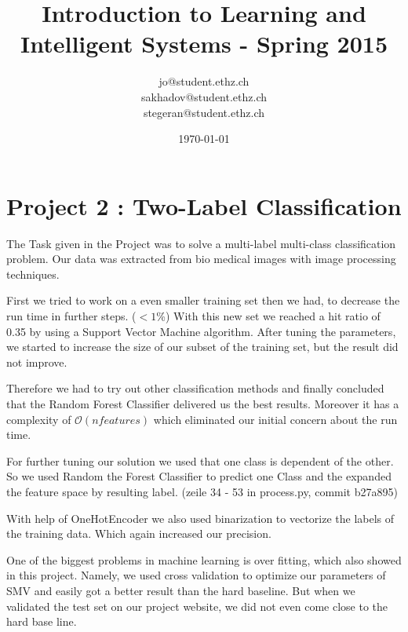 \documentclass[a4paper, 11pt]{article}
\title{Introduction to Learning and Intelligent Systems - Spring 2015}
\author{jo@student.ethz.ch\\ sakhadov@student.ethz.ch\\  stegeran@student.ethz.ch\\}
\date{\today}
\begin{document}
\maketitle

\section*{Project 2 : Two-Label Classification}

The Task given in the Project was to solve a multi-label multi-class classification problem. Our data was extracted from bio medical images with image processing techniques.

First we tried to work on a even smaller training set then we had, to decrease the run time in further steps. ($<1$\%) With this new set we reached a hit ratio of 0.35 by using a Support Vector Machine algorithm. After tuning the parameters, we started to increase the size of our subset of the training set, but the result did not improve.

Therefore we had to try out other classification methods and finally concluded that the Random Forest Classifier delivered us the best results. Moreover it has a complexity of $\mathcal{O}(nfeatures)$ which eliminated our initial concern about the run time.

For further tuning our solution we used that one class is dependent of the other. So we used Random the Forest Classifier to predict one Class and the expanded the feature space by resulting label. 
(zeile 34 - 53 in process.py, commit b27a895)

With help of OneHotEncoder we also used binarization to vectorize the labels of the training data. Which again increased our precision.

One of the biggest problems in machine learning is over fitting, which also showed in this project. Namely, we used cross validation to optimize our parameters of SMV and easily got a better result than the hard baseline. But when we validated the test set on our project website, we did not even come close to the hard base line.
\end{document}
